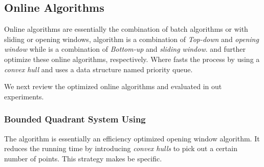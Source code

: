 \vspace{-1ex}
\subsection{Online Algorithms}





Online \lsa algorithms are essentially the combination of batch algorithms \dpa or \tpa with sliding or opening windows, \eg algorithm \opwa \cite{Meratnia:Spatiotemporal} is a combination of \textit{Top-down} and \textit{opening window} while \cite{Keogh:online} is a combination of \textit{Bottom-up} and \textit{sliding window}.
\bqsa \cite{Liu:BQS} and \squishe\cite{Muckell:Compression} further optimize these online algorithms, respectively. Where \bqsa \cite{Liu:BQS} fasts the process by using a \textit{convex hull} and \squishe\cite{Muckell:Compression} uses a data structure named priority queue.





We next review the optimized online algorithms \bqsa and \squishe evaluated in out experiments.

\vspace{-0.5ex}
\subsubsection{Bounded Quadrant System Using \ped}
The \bqsa algorithm \cite{Liu:BQS} is essentially an efficiency optimized opening window algorithm\cite{Meratnia:Spatiotemporal}. It reduces the running time by introducing \textit{convex hulls} to pick out a certain number of points. This strategy makes \bqsa be \ped specific.

